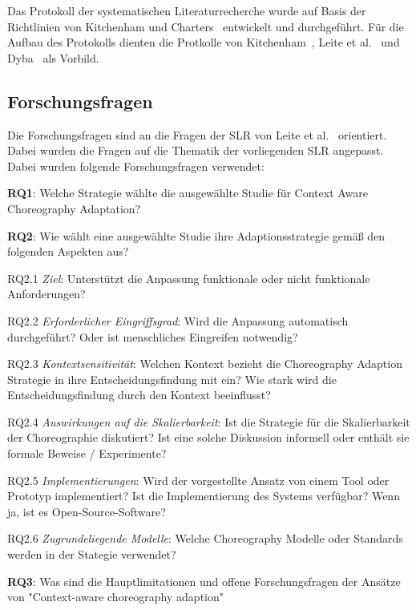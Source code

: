 \documentclass[conference,compsoc]{IEEEtran}
\begin{document}
Das Protokoll der systematischen Literaturrecherche wurde auf Basis der Richtlinien von Kitchenham und Charters~\cite{keele2007guidelines} entwickelt und durchgeführt. Für die Aufbau des Protokolls dienten die Protkolle von Kitchenham~\cite{kitchenham2009systematic}, Leite et al.~\cite{leite2013systematic} und Dyba~\cite{dybaa2008empirical} als Vorbild.
\subsection{Forschungsfragen}
Die Forschungsfragen sind an die Fragen der SLR von Leite et al.~\cite{leite2013systematic} orientiert. Dabei wurden die Fragen auf die Thematik der vorliegenden SLR angepasst.
Dabei wurden folgende Forschungsfragen verwendet:


\textbf{RQ1}: Welche Strategie wählte die ausgewählte Studie für Context Aware Choreography Adaptation? 

\textbf{RQ2}: Wie wählt eine ausgewählte Studie ihre Adaptionsstrategie gemäß den folgenden Aspekten aus?

RQ2.1 \textit{Ziel}: Unterstützt die Anpassung funktionale oder nicht funktionale Anforderungen?

RQ2.2 \textit{Erforderlicher Eingriffsgrad}: Wird die Anpassung automatisch durchgeführt? Oder ist menschliches Eingreifen notwendig?

RQ2.3 \textit{Kontextsensitivität}: Welchen Kontext bezieht die Choreography Adaption Strategie in ihre Entscheidungsfindung mit ein? Wie stark wird die Entscheidungsfindung durch den Kontext beeinflusst?

RQ2.4 \textit{Auswirkungen auf die Skalierbarkeit}: Ist die Strategie für die Skalierbarkeit der Choreographie diskutiert? Ist eine solche Diskussion informell oder enthält sie formale Beweise / Experimente?

RQ2.5 \textit{Implementierungen}: Wird der vorgestellte Ansatz von einem Tool oder Prototyp implementiert? Ist die Implementierung des Systems verfügbar? Wenn ja, ist es Open-Source-Software?

RQ2.6 \textit{Zugrundeliegende Modelle}: Welche Choreography Modelle oder Standards werden in der Stategie verwendet?

\textbf{RQ3}: Was sind die Hauptlimitationen und offene Forschungsfragen der Ansätze von "Context-aware choreography adaption"
\end{document}
